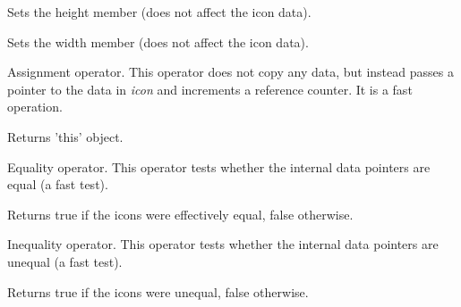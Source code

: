 

\label{wxiconsetheight}


Sets the height member (does not affect the icon data).



\label{wxiconsetwidth}


Sets the width member (does not affect the icon data).



\label{wxiconassign}


Assignment operator. This operator does not copy any data, but instead
passes a pointer to the data in {\it icon} and increments a reference
counter. It is a fast operation.




Returns 'this' object.

\label{wxiconequal}


Equality operator. This operator tests whether the internal data pointers are
equal (a fast test).




Returns true if the icons were effectively equal, false otherwise.

\label{wxiconnotequal}


Inequality operator. This operator tests whether the internal data pointers are
unequal (a fast test).




Returns true if the icons were unequal, false otherwise.



